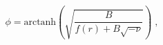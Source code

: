 \begin{equation}
\phi =\textrm{arctanh}\left( \sqrt{\frac{B}{f(r)+B\sqrt{-\nu }}}\right) \;,
\label{PhiNS}
\end{equation}

